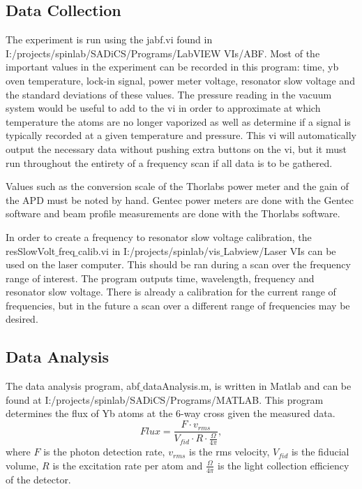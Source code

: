 \documentclass[12pt, a4paper]{article}
\begin{document}
\subsection{Data Collection}
The experiment is run using the jabf.vi found in I:/projects/spinlab/SADiCS/Programs/LabVIEW VIs/ABF. Most of the important values in the experiment can be recorded in this program: time, yb oven temperature, lock-in signal, power meter voltage, resonator slow voltage and the standard deviations of these values. The pressure reading in the vacuum system would be useful to add to the vi in order to approximate at which temperature the atoms are no longer vaporized as well as determine if a signal is typically recorded at a given temperature and pressure. This vi will automatically output the necessary data without pushing extra buttons on the vi, but it must run throughout the entirety of a frequency scan if all data is to be gathered. 

Values such as the conversion scale of the Thorlabs power meter and the gain of the APD must be noted by hand. Gentec power meters are done with the Gentec software and beam profile measurements are done with the Thorlabs software.

In order to create a frequency to resonator slow voltage calibration, the resSlowVolt$\_$freq$\_$calib.vi in I:/projects/spinlab/vis$\_$Labview/Laser VIs can be used on the laser computer. This should be ran during a scan over the frequency range of interest. The program outputs time, wavelength, frequency and resonator slow voltage. There is already a calibration for the current range of frequencies, but in the future a scan over a different range of frequencies may be desired.

\subsection{Data Analysis}
The data analysis program, abf$\_$dataAnalysis.m,  is written in Matlab and can be found at I:/projects/spinlab/SADiCS/Programs/MATLAB. This program determines the flux of Yb atoms at the 6-way cross given the measured data. 
\begin{equation}
Flux = \frac{F \cdot v_{rms}}{V_{fid}\cdot R \cdot \frac{\Omega}{4\pi} },
\end{equation}
where $F$ is the photon detection rate, $v_{rms}$ is the rms velocity, $V_{fid}$ is the fiducial volume, $R$ is the excitation rate per atom and $\frac{\Omega}{4 \pi}$ is the light collection efficiency of the detector. 
\end{document}
